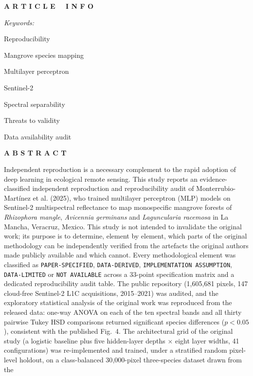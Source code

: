 \documentclass[10pt,twocolumn,a4paper]{article}
\newcommand{\evc}[1]{{\footnotesize\texttt{#1}}}
\begin{document}
{\noindent
\begin{minipage}[t]{0.23\textwidth}
\footnotesize
\textbf{A R T I C L E \ \ I N F O}\par\vspace{6pt}
\textit{Keywords:}\par
Reproducibility\par
Mangrove species mapping\par
Multilayer perceptron\par
Sentinel-2\par
Spectral separability\par
Threats to validity\par
Data availability audit
\end{minipage}
\hfill
\begin{minipage}[t]{0.72\textwidth}
\footnotesize
\textbf{A B S T R A C T}\par\vspace{6pt}
Independent reproduction is a necessary complement to the rapid adoption of deep learning in
ecological remote sensing. This study reports an evidence-classified independent reproduction and
reproducibility audit of Monterrubio-Mart\'inez et al. (2025), who trained multilayer perceptron
(MLP) models on Sentinel-2 multispectral reflectance to map monospecific mangrove forests of
\emph{Rhizophora mangle}, \emph{Avicennia germinans} and \emph{Laguncularia racemosa} in La Mancha,
Veracruz, Mexico. This study is not intended to invalidate the original work; its purpose is to
determine, element by element, which parts of the original methodology can be independently
verified from the artefacts the original authors made publicly available and which cannot. Every
methodological element was classified as \evc{PAPER-SPECIFIED}, \evc{DATA-DERIVED},
\evc{IMPLEMENTATION ASSUMPTION}, \evc{DATA-LIMITED} or \evc{NOT AVAILABLE} across a 33-point
specification matrix and a dedicated reproducibility audit table. The public repository
(1{,}605{,}681 pixels, 147 cloud-free Sentinel-2 L1C acquisitions, 2015--2021) was audited, and the
exploratory statistical analysis of the original work was reproduced from the released data:
one-way ANOVA on each of the ten spectral bands and all thirty pairwise Tukey HSD comparisons
returned significant species differences ($p<0.05$), consistent with the published Fig.~4. The
architectural grid of the original study (a logistic baseline plus five hidden-layer depths
$\times$ eight layer widths, 41 configurations) was re-implemented and trained, under a stratified
random pixel-level holdout, on a class-balanced 30{,}000-pixel three-species dataset drawn from the

\end{minipage}}
\end{document}
